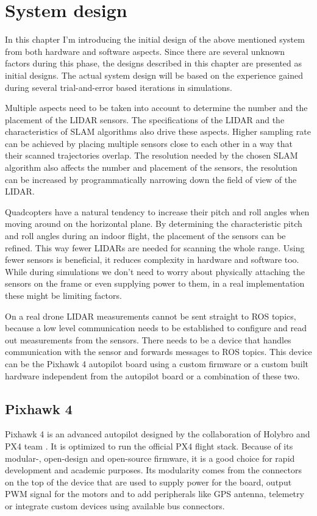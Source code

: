 \chapter{System design}
In this chapter I'm introducing the initial design of the above mentioned system from both hardware and
software aspects. Since there are several unknown factors 
during this phase, the designs described in this chapter are presented as initial designs. The actual
system design will be based on the experience gained during several trial-and-error based iterations
in simulations.

Multiple aspects need to be taken into account to determine the number and the placement of the LIDAR sensors.
The specifications of the LIDAR and the characteristics of SLAM algorithms also drive these aspects. 
Higher sampling rate can be achieved by placing multiple sensors close to each other in a way that 
their scanned trajectories overlap. The resolution needed by the chosen SLAM algorithm also affects 
the number and placement of the sensors, the resolution can be increased by programmatically narrowing
down the field of view of the LIDAR.

Quadcopters have a natural tendency to increase their pitch and roll angles when moving around 
on the horizontal plane. By determining the characteristic pitch and roll angles during an indoor flight,
the placement of the sensors can be refined. This way fewer LIDARs are needed for scanning the
whole range. Using fewer sensors is beneficial, it reduces complexity in hardware and software too.
While during simulations we don't need to worry about physically attaching the sensors on the frame or even
supplying power to them, in a real implementation these might be limiting factors.

On a real drone LIDAR measurements cannot be sent straight to ROS topics, because a low level communication needs
to be established to configure and read out measurements from the sensors. There needs to be a device that 
handles communication with the sensor and forwards messages to ROS topics.
This device can be the Pixhawk 4 autopilot board using a custom firmware or a custom built hardware 
independent from the autopilot board or a combination of these two.

\section{Pixhawk 4}
Pixhawk 4 is an advanced autopilot designed by the collaboration of Holybro and PX4 team \cite{Pixhawk4Website}. 
It is optimized to run the official PX4 flight stack. Because of its modular-, open-design and open-source 
firmware, it is a good choice for rapid development and academic purposes. Its modularity comes from the 
connectors on the top of the device that are used to supply power for the board, output PWM signal for 
the motors and to add peripherals like GPS antenna, telemetry or integrate custom devices using available
bus connectors. 

